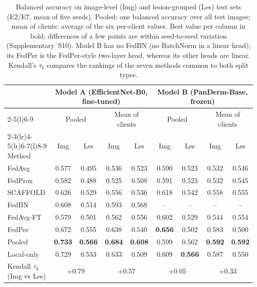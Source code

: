 \documentclass[VANCOUVER,Times1COL]{WileyNJDv5}
\begin{document}
\begin{table}[!t]
\centering
\caption{Balanced accuracy on image-level (Img) and lesion-grouped (Les) test sets (E2/E7, mean of five
seeds). Pooled: one balanced accuracy over all test images; mean of clients: average of the six per-client
values. Best value per column in bold; differences of a few points are within seed-to-seed variation
(Supplementary~S10). Model B has no FedBN (no BatchNorm in a linear head); its FedPer is the FedPer-style
two-layer head, whereas its other heads are linear. Kendall's $\tau_b$ compares the rankings of the
seven methods common to both split types.}
\label{tab:ba}
\setlength{\tabcolsep}{4.5pt}
\begin{tabular}{@{}lcccccccc@{}}
\toprule
 & \multicolumn{4}{c}{Model A (EfficientNet-B0, fine-tuned)} & \multicolumn{4}{c}{Model B (PanDerm-Base, frozen)} \\
\cmidrule(lr){2-5}\cmidrule(l){6-9}
 & \multicolumn{2}{c}{Pooled} & \multicolumn{2}{c}{Mean of clients} & \multicolumn{2}{c}{Pooled} & \multicolumn{2}{c}{Mean of clients} \\
\cmidrule(lr){2-3}\cmidrule(lr){4-5}\cmidrule(lr){6-7}\cmidrule(l){8-9}
Method & Img & Les & Img & Les & Img & Les & Img & Les \\
\midrule
FedAvg & 0.577 & 0.495 & 0.536 & 0.523 & 0.590 & 0.523 & 0.532 & 0.546 \\
FedProx & 0.582 & 0.488 & 0.525 & 0.508 & 0.591 & 0.523 & 0.532 & 0.545 \\
SCAFFOLD & 0.626 & 0.529 & 0.556 & 0.536 & 0.618 & 0.542 & 0.558 & 0.555 \\
FedBN & 0.608 & 0.514 & 0.593 & 0.568 & -- & -- & -- & -- \\
FedAvg-FT & 0.579 & 0.501 & 0.562 & 0.556 & 0.602 & 0.529 & 0.544 & 0.554 \\
FedPer & 0.672 & 0.555 & 0.638 & 0.540 & \textbf{0.656} & 0.502 & 0.583 & 0.500 \\
\midrule
Pooled & \textbf{0.733} & \textbf{0.566} & \textbf{0.684} & \textbf{0.608} & 0.599 & 0.562 & \textbf{0.592} & \textbf{0.592} \\
Local-only & 0.729 & 0.533 & 0.633 & 0.509 & 0.609 & \textbf{0.566} & 0.587 & 0.550 \\
\midrule
Kendall $\tau_b$ (Img vs Les) & \multicolumn{2}{c}{+0.79} & \multicolumn{2}{c}{+0.57} & \multicolumn{2}{c}{+0.05} & \multicolumn{2}{c}{+0.33} \\
\bottomrule
\end{tabular}
\end{table}
\end{document}

